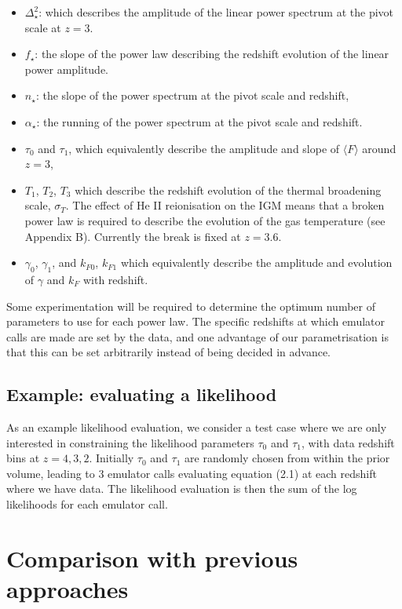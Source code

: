 \documentclass[]{article}
\begin{document}
\begin{itemize}
    \item $\Delta^2_\star$: which describes the amplitude of the linear power spectrum at 
    the pivot scale at $z=3$.
    \item $f_\star$: the slope of the power law describing the redshift evolution of the 
    linear power amplitude.
    \item $n_\star$: the slope of the power spectrum at the pivot scale and redshift,
    \item $\alpha_\star$: the running of the power spectrum at the pivot scale and redshift.
    \item  $\tau_0$ and $\tau_1$, which equivalently describe the amplitude and slope of $\langle F\rangle$ around $z=3$,
    \item  $T_1$, $T_2$, $T_3$ which describe the redshift evolution of the thermal 
    broadening scale, $\sigma_T$. The effect of He II reionisation on the IGM means that 
    a broken power law is required to describe the evolution of the gas temperature (see 
    Appendix B). Currently the break is fixed at $z=3.6$.
    \item $\gamma_0$, $\gamma_1$, and $k_{F0}$, $k_{F1}$ which equivalently describe the amplitude and evolution of $\gamma$ and $k_F$ with redshift.
\end{itemize}

\noindent Some experimentation will be required to determine the optimum number of 
parameters to use for each power law. The specific redshifts at which emulator calls are 
made are set by the data, and one advantage of our parametrisation is that this can be 
set arbitrarily instead of being decided in advance.

\subsection{Example: evaluating a likelihood}
As an example likelihood evaluation, we consider a test case where we are only interested 
in constraining the likelihood parameters $\tau_0$ and $\tau_1$, with data redshift bins 
at $z=4,3,2$. Initially $\tau_0$ and $\tau_1$ are randomly chosen from within the prior 
volume, leading to 3 emulator calls evaluating equation (2.1) at each redshift where we 
have data. The likelihood evaluation is then the sum of the log likelihoods for each 
emulator call.


\section{Comparison with previous approaches}
\end{document}
